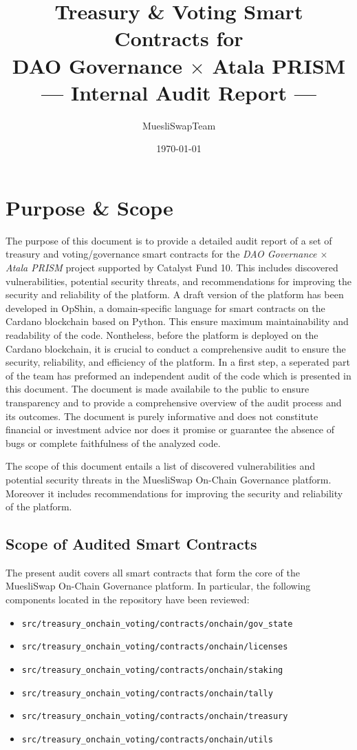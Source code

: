 \documentclass[11pt]{article}
\title{Treasury \& Voting Smart Contracts for\\DAO Governance $\times$ Atala PRISM\\[12pt]--- Internal Audit Report ---}
\author{MuesliSwapTeam}
\date{\today}
\begin{document}
\maketitle

\section{Purpose \& Scope}
The purpose of this document is to provide a detailed audit report of a set of treasury and voting/governance smart contracts for the \emph{DAO Governance $\times$ Atala PRISM} project supported by Catalyst Fund 10. This includes discovered vulnerabilities, potential security threats, and recommendations for improving the security and reliability of the platform. A draft version of the platform has been developed in OpShin, a domain-specific language for smart contracts on the Cardano blockchain based on Python.
This ensure maximum maintainability and readability of the code.
Nontheless, before the platform is deployed on the Cardano blockchain, it is crucial to conduct a comprehensive audit to ensure the security, reliability, and efficiency of the platform.
In a first step, a seperated part of the team has preformed an independent audit of the code which is presented in this document.
The document is made availabile to the public to ensure transparency and to provide a comprehensive overview of the audit process and its outcomes.
The document is purely informative and does not constitute financial or investment advice nor does it promise or guarantee the absence of bugs
or complete faithfulness of the analyzed code.

The scope of this document entails a list of discovered vulnerabilities and potential security threats in the MuesliSwap On-Chain Governance platform.
Moreover it includes recommendations for improving the security and reliability of the platform.

\subsection{Scope of Audited Smart Contracts}

The present audit covers all smart contracts that form the core of the MuesliSwap On-Chain Governance platform. In particular, the following components located in the repository have been reviewed:

\begin{itemize}
    \item \texttt{src/treasury\_onchain\_voting/contracts/onchain/gov\_state}
    \item \texttt{src/treasury\_onchain\_voting/contracts/onchain/licenses}
    \item \texttt{src/treasury\_onchain\_voting/contracts/onchain/staking}
    \item \texttt{src/treasury\_onchain\_voting/contracts/onchain/tally}
    \item \texttt{src/treasury\_onchain\_voting/contracts/onchain/treasury}
    \item \texttt{src/treasury\_onchain\_voting/contracts/onchain/utils}
\end{itemize}
\end{document}

